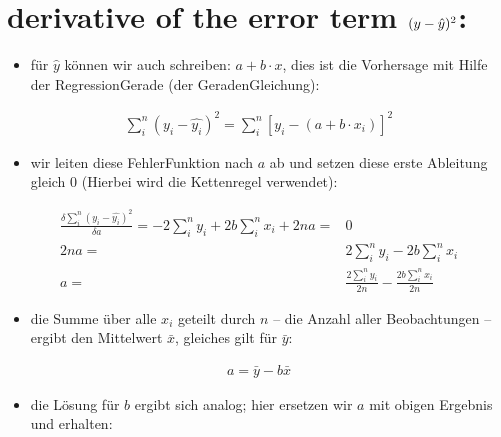 \documentclass[letterpaper,10pt,english]{jupyterBook}
\begin{document}
\chapter{derivative of the error term \protect\((y - \hat{y})^2\protect\):}
\label{\detokenize{Regression_Techniques:derivative-of-the-error-term-y-hat-y-2}}\begin{itemize}
\item {} 
\sphinxAtStartPar
für \(\hat{y}\) können wir auch schreiben: \(a + b\cdot x\), dies ist die Vorhersage mit Hilfe der Regression\sphinxhyphen{}Gerade (der Geraden\sphinxhyphen{}Gleichung):

\end{itemize}
\begin{equation*}
\begin{split}\sum_i^{n}(y_i - \hat{y_i})^2 = \sum_i^{n}[y_i - (a + b\cdot x_i)]^{2}\end{split}
\end{equation*}\begin{itemize}
\item {} 
\sphinxAtStartPar
wir leiten diese Fehler\sphinxhyphen{}Funktion nach \(a\) ab und setzen diese erste Ableitung gleich \(0\) (Hierbei wird die Kettenregel verwendet):

\end{itemize}
\begin{align*}
\frac{\delta \sum_i^{n}(y_i - \hat{y_i})^2}{\delta a} = -2\sum_i^{n}y_i + 2b\sum_i^{n}x_i + 2na =& 0\\
2na =& 2\sum_i^{n}y_i - 2b\sum_i^{n}x_i\\
  a =& \frac{2\sum_i^{n}y_i}{2n} - \frac{2b\sum_i^{n}x_i}{2n}
\end{align*}\begin{itemize}
\item {} 
\sphinxAtStartPar
die Summe über alle \(x_i\) geteilt durch \(n\) – die Anzahl aller Beobachtungen – ergibt den Mittelwert \(\bar{x}\), gleiches gilt für \(\bar{y}\):

\end{itemize}
\begin{equation*}
\begin{split}a = \bar{y} - b\bar{x}\end{split}
\end{equation*}\begin{itemize}
\item {} 
\sphinxAtStartPar
die Lösung für \(b\) ergibt sich analog; hier ersetzen wir \(a\) mit obigen Ergebnis und erhalten:

\end{itemize}
\end{document}
